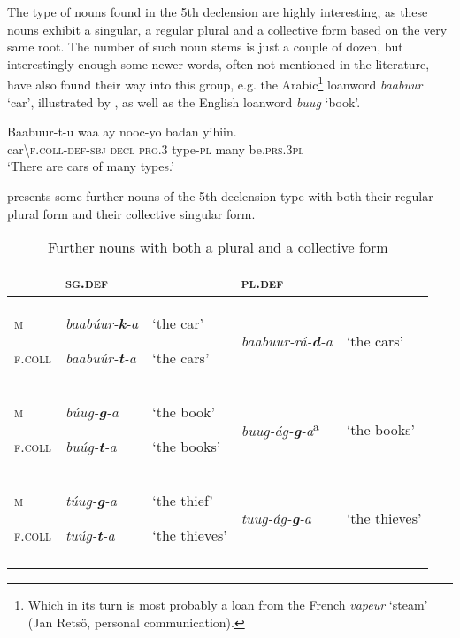 \documentclass[output=paper]{langsci/langscibook}
\begin{document}
The type of nouns found in the 5th declension are highly interesting, as these nouns exhibit a singular, a regular plural and a collective form based on the very same root. The number of such noun stems is just a couple of dozen, but interestingly enough some newer words, often not mentioned in the literature, have also found their way into this group, e.g. the Arabic\footnote{Which in its turn is most probably a loan from the French \textit{vapeur} ‘steam’ (Jan Retsö, personal communication).} loanword \textit{baabuur} ‘car’, illustrated by , as well as the English loanword \textit{buug} ‘book’.

\ea\label{ex:nilsson:7}
\gll Baabuur-t-u     waa    ay    nooc-yo  badan   yihiin.\\
     car{\textbackslash}\textsc{f.coll-def-sbj}  \textsc{decl}   \textsc{pro.3}  type-\textsc{pl}  many   be.\textsc{prs.3pl}\\
\glt ‘There are cars of many types.’
\z

 presents some further nouns of the 5th declension type with both their regular plural form and their collective singular form.
 
\begin{table}
\caption{Further nouns with both a plural and a collective form}
\label{tab:nilsson:10}
\begin{tabularx}{\textwidth}{XXXlX} 
\lsptoprule
& {\textsc{sg.def}} &  & {\textsc{pl.def}} & \\
\midrule
{\textsc{m}}

{\textsc{f.coll}} & {\textit{baabúur-}\textbf{\textit{k}}\textit{-a}}

{\textit{baabuúr-}\textbf{\textit{t}}\textit{-a}} & {‘the car’}

{‘the cars’} & {\textit{baabuur-rá-}\textbf{\textit{d}}\textit{-a}} & {‘the cars’}\\
\tablevspace
{\textsc{m}}

{\textsc{f.coll}} & {\textit{búug-}\textbf{\textit{g}}\textit{-a}}

{\textit{buúg-}\textbf{\textit{t}}\textit{-a}} & {‘the book’}

{‘the books’} & {\textit{buug-ág-}\textbf{\textit{g}}\textit{-a}\textsuperscript{a}} & {‘the books’}\\
\tablevspace
{\textsc{m}}

{\textsc{f.coll}} & {\textit{túug-}\textbf{\textit{g}}\textit{-a}}

{\textit{tuúg-}\textbf{\textit{t}}\textit{-a}} & {‘the thief’}

{‘the thieves’} & {\textit{tuug-ág-}\textbf{\textit{g}}\textit{-a}} & {‘the thieves’}\\
\lspbottomrule
\end{tabularx}

\end{table} 
\end{document}
